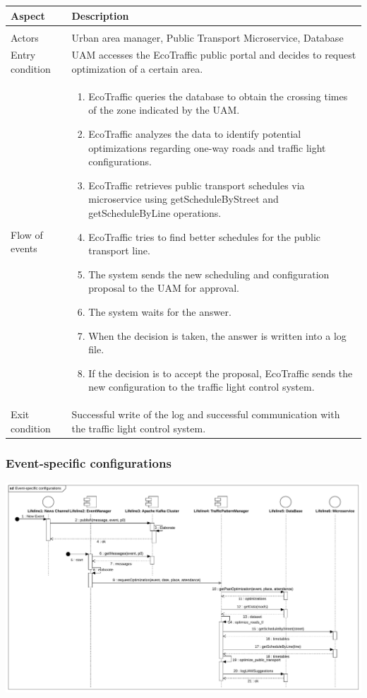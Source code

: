 \documentclass[12pt, a4paper, twoside, openright]{report}
\begin{document}
\begin{longtable}{>{\raggedright\arraybackslash}p{} >{\raggedright\arraybackslash}p{}}
\toprule
\textbf{Aspect} & \textbf{Description} \\
\midrule
\endhead
\midrule
\multicolumn{2}{r}{\textit{Continues on next page}} \\
\endfoot
\bottomrule
\endlastfoot

Actors & Urban area manager, Public Transport Microservice, Database \\
Entry condition & UAM accesses the EcoTraffic public portal and decides to request optimization of a certain area. \\
Flow of events &
\begin{enumerate}
  \item EcoTraffic queries the database to obtain the crossing times of the zone indicated by the UAM.
  \item EcoTraffic analyzes the data to identify potential optimizations regarding one-way roads and traffic light configurations.
  \item EcoTraffic retrieves public transport schedules via microservice using getScheduleByStreet and getScheduleByLine operations.
  \item EcoTraffic tries to find better schedules for the public transport line.
  \item The system sends the new scheduling and configuration proposal to the UAM for approval.
  \item The system waits for the answer.
  \item When the decision is taken, the answer is written into a log file.
  \item If the decision is to accept the proposal, EcoTraffic sends the new configuration to the traffic light control system.
\end{enumerate}
\\
Exit condition & Successful write of the log and successful communication with the traffic light control system. \\
\end{longtable}

\subsubsection{Event-specific configurations}

\includegraphics[width=\linewidth]{images/svg/event-specific_configurations.pdf}
\end{document}
